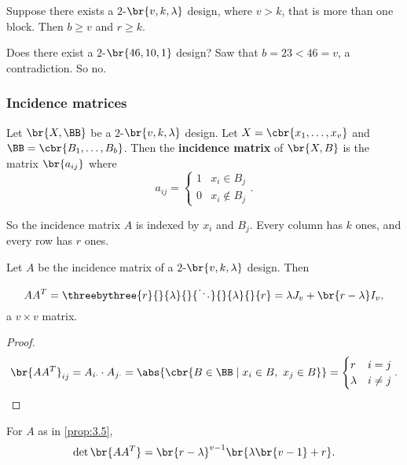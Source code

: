 \begin{theorem}
\label{thm:3.4}
Suppose there exists a $ 2 $-$ \br{v, k, \lambda} $ design, where $ v > k $, that is more than one block. Then $ b \ge v $ and $ r \ge k $.
\end{theorem}


\begin{example*}
Does there exist a $ 2 $-$ \br{46, 10, 1} $ design? Saw that $ b = 23 < 46 = v $, a contradiction. So no.
\end{example*}

\subsubsection{Incidence matrices}

\begin{definition*}
Let $ \br{X, \BB} $ be a $ 2 $-$ \br{v, k, \lambda} $ design. Let $ X = \cbr{x_1, \dots, x_v} $ and $ \BB = \cbr{B_1, \dots, B_b} $. Then the \textbf{incidence matrix} of $ \br{X, B} $ is the matrix $ \br{a_{ij}} $ where
$$ a_{ij} =
\begin{cases}
1 & x_i \in B_j \\
0 & x_i \notin B_j
\end{cases}.
$$
\end{definition*}

So the incidence matrix $ A $ is indexed by $ x_i $ and $ B_j $. Every column has $ k $ ones, and every row has $ r $ ones.

\begin{proposition}
\label{prop:3.5}
Let $ A $ be the incidence matrix of a $ 2 $-$ \br{v, k, \lambda} $ design. Then
$$ AA^T = \threebythree{r}{}{\lambda}{}{\ddots}{}{\lambda}{}{r} = \lambda J_v + \br{r - \lambda}I_v, $$
a $ v \times v $ matrix.
\end{proposition}

\begin{proof}
$$ \br{AA^T}_{ij} = A_{i\cdot} \cdot A_{j\cdot} = \abs{\cbr{B \in \BB \mid x_i \in B, \ x_j \in B}} =
\begin{cases}
r & i = j \\
\lambda & i \ne j
\end{cases}.
$$
\end{proof}

\begin{proposition}
For $ A $ as in \ref{prop:3.5},
$$ \det\br{AA^T} = \br{r - \lambda}^{v - 1}\br{\lambda\br{v - 1} + r}. $$
\end{proposition}


